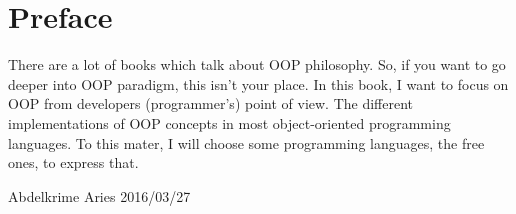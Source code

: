 \documentclass[12pt]{book}
\begin{document}
	\chapter*{Preface}
\fi

There are a lot of books which talk about OOP philosophy. 
So, if you want to go deeper into OOP paradigm, this isn't your place. 
In this book, I want to focus on OOP from developers (programmer's) point of view.
The different implementations of OOP concepts in most object-oriented programming languages.
To this mater, I will choose some programming languages, the free ones, to express that.


\vfill
\begin{flushright}
Abdelkrime Aries 2016/03/27
\end{flushright}

\ifx\wholebook\relax\else
% 
% 
	
\end{document}

